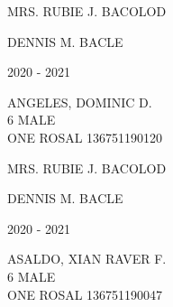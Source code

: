 \documentclass{article}
\begin{document}
{{\begin{multicols}{2}
\begin{flushright}
MRS. RUBIE J. BACOLOD \hspace*{-1.5em}
\end{flushright}  
\vspace*{1.5mm}
\hspace*{3em} DENNIS M. BACLE
\end{multicols} 
\newpage
\begin{multicols}{2}
\phantom{u}
\columnbreak
\vspace*{-3mm}
\begin{center}
\phantom{school year:} \hspace*{6em} 2020 - 2021 
\end{center} 
\vspace{4mm} 
\phantom{Name:} \hspace*{5em} ANGELES, DOMINIC D. \\[2.5mm] %
\phantom{Age} \hspace*{8em} 6  \phantom{Sex} \hspace*{12em} MALE \\[2.5mm] %
\phantom{Grade} \hspace*{3em} ONE \phantom{Section} \hspace*{4em} ROSAL \phantom{LRN} \hspace*{4em} 136751190120 \\
\vspace*{25mm}
\begin{flushright}
MRS. RUBIE J. BACOLOD \hspace*{-1.5em}
\end{flushright}  
\vspace*{1.5mm}
\hspace*{3em} DENNIS M. BACLE
\end{multicols} 
\newpage
\begin{multicols}{2}
\phantom{u}
\columnbreak
\vspace*{-3mm}
\begin{center}
\phantom{school year:} \hspace*{6em} 2020 - 2021 
\end{center} 
\vspace{4mm} 
\phantom{Name:} \hspace*{5em} ASALDO, XIAN RAVER F. \\[2.5mm] %
\phantom{Age} \hspace*{8em} 6  \phantom{Sex} \hspace*{12em} MALE \\[2.5mm] %
\phantom{Grade} \hspace*{3em} ONE \phantom{Section} \hspace*{4em} ROSAL \phantom{LRN} \hspace*{4em} 136751190047 \\

\end{multicols}}}
\end{document}

